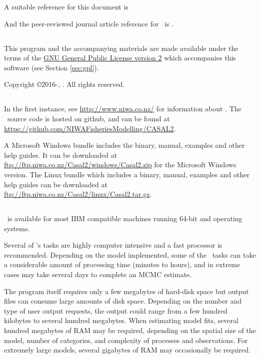 A suitable reference for this document is \ManualRef

And the peer-reviewed journal article reference for \CNAME\ is \citep{doonan_casal2}.

\subsection{}

This program and the accompanying materials are made available under the terms of the \href{http://www.opensource.org/licenses/GPL-2.0}{GNU General Public License version 2} which accompanies this software (see Section \ref{sec:gpl}).

Copyright \copyright 2016-\SourceControlYearDoc, \href{http://www.niwa.co.nz}{\Organisation}. All rights reserved.

\subsection{}

In the first instance, see \url{http://www.niwa.co.nz/} for information about \CNAME . The \CNAME\ source code is hosted on github, and can be found at \url{https://github.com/NIWAFisheriesModelling/CASAL2}.

A Microsoft Windows bundle includes the binary, manual, examples and other help guides. It can be downloaded at \url{ftp://ftp.niwa.co.nz/Casal2/windows/Casal2.zip} for the Microsoft Windows version. The Linux bundle which includes a binary, manual, examples and other help guides can be downloaded at \url{ftp://ftp.niwa.co.nz/Casal2/linux/Casal2.tar.gz}.

\subsection{}

\CNAME\ is available for most IBM compatible machines running 64-bit  and  operating systems.

Several of \CNAME 's tasks are highly computer intensive and a fast processor is recommended. Depending on the model implemented, some of the \CNAME\ tasks can take a considerable amount of processing time (minutes to hours), and in extreme cases may take several days to complete an MCMC estimate. 

The program itself requires only a few megabytes of hard-disk space but output files can consume large amounts of disk space. Depending on the number and type of user output requests, the output could range from a few hundred kilobytes to several hundred megabytes. When estimating model fits, several hundred megabytes of RAM may be required, depending on the spatial size of the model, number of categories, and complexity of processes and observations. For extremely large models, several gigabytes of RAM may occasionally be required. 

